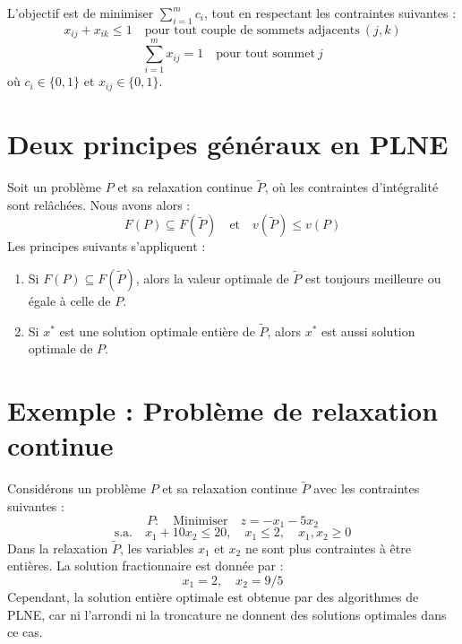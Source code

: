 \documentclass{report}
\begin{document}
\begin{multicols*}{2}
L'objectif est de minimiser \( \sum_{i=1}^{m} c_i \), tout en respectant les 
contraintes suivantes :
\[
\boxed{
x_{ij} + x_{ik} \leq 1 \quad \text{pour tout couple de sommets adjacents} \ (j, k)
}
\]
\[
\sum_{i=1}^{m} x_{ij} = 1 \quad \text{pour tout sommet} \ j
\]
où \( c_i \in \{0, 1\} \) et \( x_{ij} \in \{0, 1\} \).

\section{Deux principes généraux en PLNE}

Soit un problème \( P \) et sa relaxation continue \( \tilde{P} \), où les 
contraintes d'intégralité sont relâchées. Nous avons alors :
\[
F(P) \subseteq F(\tilde{P}) \quad \text{et} \quad v(\tilde{P}) \leq v(P)
\]
Les principes suivants s'appliquent :
\begin{enumerate}
    \item Si \( F(P) \subseteq F(\tilde{P}) \), alors la valeur optimale de 
    \( \tilde{P} \) est toujours meilleure ou égale à celle de \( P \).
    
    \item Si \( x^* \) est une solution optimale entière de \( \tilde{P} \), 
    alors \( x^* \) est aussi solution optimale de \( P \).
\end{enumerate}

\section{Exemple : Problème de relaxation continue}

Considérons un problème \( P \) et sa relaxation continue \( \tilde{P} \) avec 
les contraintes suivantes :
\[
P: \quad \text{Minimiser} \quad z = -x_1 - 5x_2
\]
\[
\text{s.a.} \quad x_1 + 10x_2 \leq 20, \quad x_1 \leq 2, \quad x_1, x_2 \geq 0
\]
Dans la relaxation \( \tilde{P} \), les variables \( x_1 \) et \( x_2 \) ne sont 
plus contraintes à être entières. La solution fractionnaire est donnée par :
\[
x_1 = 2, \quad x_2 = 9/5
\]
Cependant, la solution entière optimale est obtenue par des algorithmes de PLNE, 
car ni l'arrondi ni la troncature ne donnent des solutions optimales dans ce cas.


\end{multicols*}
\end{document}
